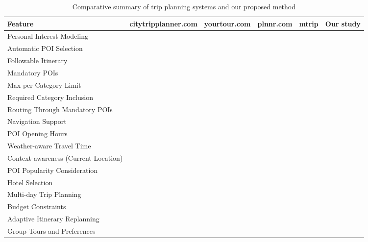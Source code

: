 \documentclass[sigconf,authordraft]{acmart}
\newcommand{\cmark}{\ding{51}} %
\begin{document}
\begin{table}[htbp]
\centering
\caption{Comparative summary of trip planning systems and our proposed method}
\begin{adjustbox}{max width=\textwidth}
\begin{tabular}{lccccc}
\toprule
\textbf{Feature} & \textbf{citytripplanner.com} & \textbf{yourtour.com} & \textbf{plnnr.com} & \textbf{mtrip} & \textbf{Our study} \\
\midrule
Personal Interest Modeling          & \cmark & \cmark & \cmark & \cmark & \cmark \\
Automatic POI Selection             & \cmark & \cmark & \cmark & \cmark & \cmark \\
Followable Itinerary                & \cmark &        & \cmark & \cmark & \cmark \\
Mandatory POIs                      & \cmark & \cmark & \cmark & \cmark & \cmark \\
Max per Category Limit              &        &        &        &        & \cmark \\
Required Category Inclusion         &        &        &        &        & \cmark \\
Routing Through Mandatory POIs      & \cmark & \cmark & \cmark & \cmark & \cmark \\
Navigation Support                  & \cmark & \cmark & \cmark & \cmark & \cmark \\
POI Opening Hours                   & \cmark &        &        &        & \cmark \\
Weather-aware Travel Time           &        &        &        &        & \cmark \\
Context-awareness (Current Location)&        &        &        & \cmark & \cmark \\
POI Popularity Consideration        &        &        & \cmark & \cmark & \cmark \\
Hotel Selection                     &        & \cmark & \cmark & \cmark &        \\
Multi-day Trip Planning             & \cmark & \cmark & \cmark & \cmark & \cmark \\
Budget Constraints                  &        & \cmark &        &        & \cmark \\
Adaptive Itinerary Replanning       &        &        &        & \cmark & \cmark \\
Group Tours and Preferences         &        & \cmark & \cmark &        &        \\
\bottomrule
\end{tabular}
\end{adjustbox}
\end{table}
\end{document}
